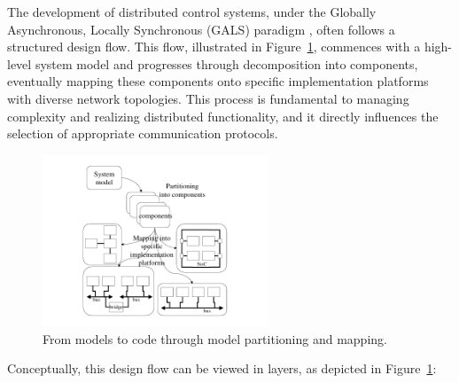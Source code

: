 The development of distributed control systems, under the Globally Asynchronous, Locally Synchronous (GALS) paradigm \cite{galsactd, galsborman}, often follows a structured design flow. This flow, illustrated in Figure~\ref{fig:model_to_code_mapping}, commences with a high-level system model and progresses through decomposition into components, eventually mapping these components onto specific implementation platforms with diverse network topologies. This process is fundamental to managing complexity and realizing distributed functionality, and it directly influences the selection of appropriate communication protocols.


\begin{figure}[htbp]
  \centering
 \includegraphics[width=0.6\textwidth]{Chapters/Figures/model_to_code_mapping.png}
  \caption{From models to code through model partitioning and mapping.}
  \label{fig:model_to_code_mapping}
\end{figure}

Conceptually, this design flow can be viewed in layers, as depicted in Figure~\ref{fig:model_to_code_mapping}:

